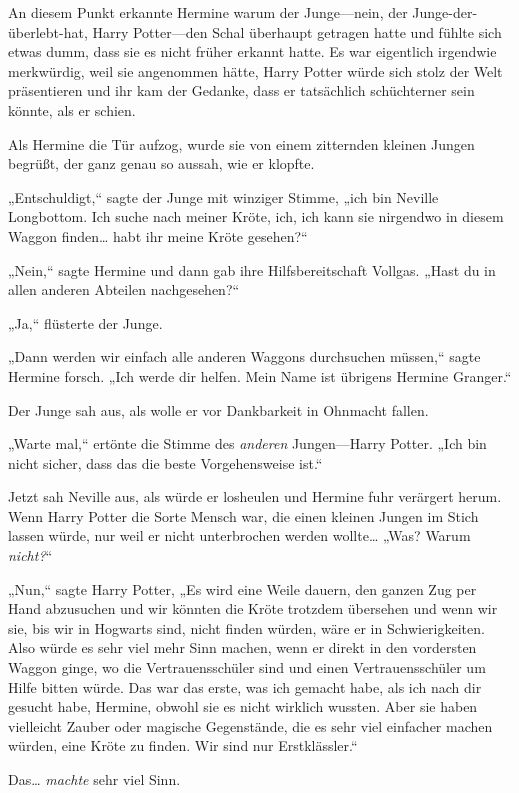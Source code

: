 {An diesem Punkt erkannte Hermine warum der Junge—nein, der Junge-der-überlebt-hat, Harry Potter—den Schal überhaupt getragen hatte und fühlte sich etwas dumm, dass sie es nicht früher erkannt hatte. Es war eigentlich irgendwie merkwürdig, weil sie angenommen hätte, Harry Potter würde sich stolz der Welt präsentieren und ihr kam der Gedanke, dass er tatsächlich schüchterner sein könnte, als er schien.

Als Hermine die Tür aufzog, wurde sie von einem zitternden kleinen Jungen begrüßt, der ganz genau so aussah, wie er klopfte.

„Entschuldigt,“ sagte der Junge mit winziger Stimme, „ich bin Neville Longbottom. Ich suche nach meiner Kröte, ich, ich kann sie nirgendwo in diesem Waggon finden… habt ihr meine Kröte gesehen?“

„Nein,“ sagte Hermine und dann gab ihre Hilfsbereitschaft Vollgas. „Hast du in allen anderen Abteilen nachgesehen?“

„Ja,“ flüsterte der Junge.

„Dann werden wir einfach alle anderen Waggons durchsuchen müssen,“ sagte Hermine forsch. „Ich werde dir helfen. Mein Name ist übrigens Hermine Granger.“

Der Junge sah aus, als wolle er vor Dankbarkeit in Ohnmacht fallen.

„Warte mal,“ ertönte die Stimme des \emph{anderen} Jungen—Harry Potter. „Ich bin nicht sicher, dass das die beste Vorgehensweise ist.“

Jetzt sah Neville aus, als würde er losheulen und Hermine fuhr verärgert herum. Wenn Harry Potter die Sorte Mensch war, die einen kleinen Jungen im Stich lassen würde, nur weil er nicht unterbrochen werden wollte… „Was? Warum \emph{nicht?}“

„Nun,“ sagte Harry Potter, „Es wird eine Weile dauern, den ganzen Zug per Hand abzusuchen und wir könnten die Kröte trotzdem übersehen und wenn wir sie, bis wir in Hogwarts sind, nicht finden würden, wäre er in Schwierigkeiten. Also würde es sehr viel mehr Sinn machen, wenn er direkt in den vordersten Waggon ginge, wo die Vertrauensschüler sind und einen Vertrauensschüler um Hilfe bitten würde. Das war das erste, was ich gemacht habe, als ich nach dir gesucht habe, Hermine, obwohl sie es nicht wirklich wussten. Aber sie haben vielleicht Zauber oder magische Gegenstände, die es sehr viel einfacher machen würden, eine Kröte zu finden. Wir sind nur Erstklässler.“

Das… \emph{machte} sehr viel Sinn.

}

